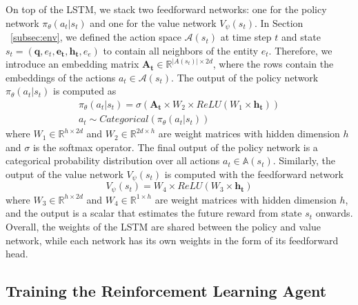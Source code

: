 On top of the LSTM, we stack two feedforward networks: one for the policy network $\pi_\theta(a_t | s_t)$ and one for the value network $V_\psi(s_t)$. In Section ~\ref{subsec:env}, we defined the action space $\mathcal{A}(s_t)$ at time step $t$ and state $s_t = (\mathbf{q}, e_t, \mathbf{e_t}, \mathbf{h_t}, e_e)$ to contain all neighbors of the entity $e_t$. Therefore, we introduce an embedding matrix $\mathbf{A_t} \in \mathbb{R}^{|A(s_t)| \times 2d}$, where the rows contain the embeddings of the actions $a_t \in \mathcal{A}(s_t)$. The output of the policy network $\pi_{\theta}(a_t|s_t)$ is computed as
\begin{equation}
	\begin{split}
	\pi_\theta(a_t | s_t) = \sigma(\mathbf{A_t} \times W_2 \times ReLU(W_1 \times \mathbf{h_t})) \\
	a_t \sim Categorical(\pi_\theta(a_t | s_t))
	\end{split}
\end{equation}
where $W_1 \in \mathbb{R}^{h \times 2d}$ and $W_2 \in \mathbb{R}^{2d \times h}$ are weight matrices with hidden dimension $h$ and $\sigma$ is the softmax operator. The final output of the policy network is a categorical probability distribution over all actions $a_t \in \mathbb{A}(s_t)$. Similarly, the output of the value network $V_{\psi}(s_t)$ is computed with the feedforward network
\begin{equation}
	V_{\psi}(s_t) = W_4 \times ReLU(W_3 \times \mathbf{h_t})
\end{equation}
where $W_3\in \mathbb{R}^{h \times 2d}$ and $W_4\in \mathbb{R}^{1 \times h}$ are weight matrices with hidden dimension $h$, and the output is a scalar that estimates the future reward from state $s_t$ onwards. Overall, the weights of the LSTM are shared between the policy and value network, while each network has its own weights in the form of its feedforward head.

\subsection{Training the Reinforcement Learning Agent}
\label{subsec:approach-description}

